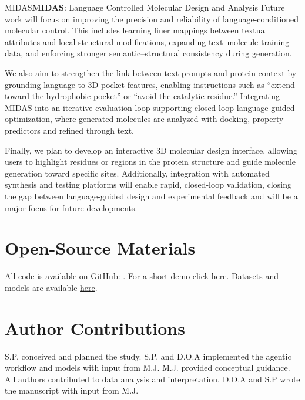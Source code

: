 \begin{teamsubmission}{MIDAS}{\textbf{MIDAS}: Language Controlled Molecular Design and Analysis}
Future work will focus on improving the precision and reliability of language-conditioned molecular control. This includes learning finer mappings between textual attributes and local structural modifications, expanding text–molecule training data, and enforcing stronger semantic–structural consistency during generation.

We also aim to strengthen the link between text prompts and protein context by grounding language to 3D pocket features, enabling instructions such as “extend toward the hydrophobic pocket” or “avoid the catalytic residue.” Integrating MIDAS into an iterative evaluation loop supporting closed-loop language-guided optimization, where generated molecules are analyzed with docking, property predictors and refined through text. 

Finally, we plan to develop an interactive 3D molecular design interface, allowing users to highlight residues or regions in the protein structure and guide molecule generation toward specific sites. Additionally, integration with automated synthesis and testing platforms will enable rapid, closed-loop validation, closing the gap between language-guided design and experimental feedback and will be a major focus for future developments.

\section*{Open-Source Materials}
All code is available on GitHub: 
.
For a short demo 
\href{https://www.youtube.com/watch?v=7uQPwcDsr5U}{click here}.
Datasets and models are available \href{https://drive.google.com/drive/folders/1KYPGxqjo9HHVani3FrhEmbZvHSaf7dro}{here}.

\section*{Author Contributions}

S.P. conceived and planned the study. S.P. and D.O.A implemented the agentic workflow and models with input from M.J. M.J. provided conceptual guidance. All authors contributed to data analysis and interpretation. D.O.A and S.P wrote the manuscript with input from M.J.


\end{teamsubmission}




